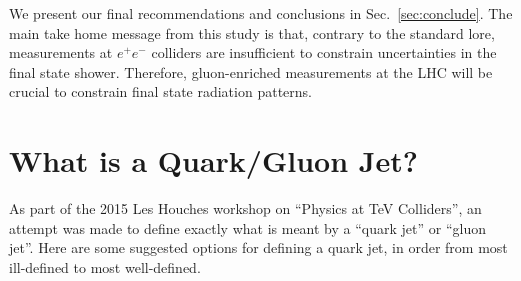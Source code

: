 \documentclass[11pt,letterpaper]{article}
\DeclareRobustCommand{\Sec}[1]{Sec.~\ref{#1}}
\begin{document}
We present our final recommendations and conclusions in \Sec{sec:conclude}.  The main take home message from this study is that, contrary to the standard lore, measurements at $e^+e^-$ colliders are insufficient to constrain uncertainties in the final state shower.   Therefore, gluon-enriched measurements at the LHC will be crucial to constrain final state radiation patterns.

\section{What is a Quark/Gluon Jet?}
\label{sec:quarkgluondef}

As part of the 2015 Les Houches workshop on ``Physics at TeV Colliders'', an attempt was made to define exactly what is meant by a ``quark jet'' or ``gluon jet''.  Here are some suggested options for defining a quark jet, in order from most ill-defined to most well-defined.
\end{document}
